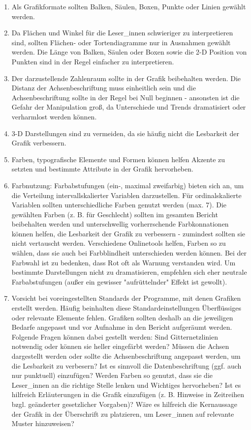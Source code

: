 \documentclass{article}
\begin{document}
\begin{enumerate}
\item Als Grafikformate sollten Balken, Säulen, Boxen, Punkte oder Linien  gewählt werden. 


\item Da Flächen und Winkel für die Leser\_innen schwieriger zu interpretieren sind, sollten Flächen- oder Tortendiagramme nur in Ausnahmen gewählt werden. Die Länge von Balken, Säulen oder Boxen sowie die 2-D Position von Punkten sind in der Regel einfacher zu interpretieren. 


\item Der darzustellende Zahlenraum sollte in der Grafik beibehalten werden. Die Distanz der Achsenbeschriftung muss einheitlich sein und die Achsenbeschriftung sollte in der Regel bei Null beginnen - ansonsten ist die Gefahr der Manipulation groß, da Unterschiede und Trends dramatisiert oder verharmlost werden können.


\item 3-D Darstellungen sind zu vermeiden, da sie häufig nicht die Lesbarkeit der Grafik verbessern. 


\item Farben, typografische Elemente und Formen können helfen Akzente zu setzten und bestimmte Attribute in der Grafik hervorheben.


\item Farbnutzung: Farbabstufungen (ein-, maximal zweifarbig) bieten sich an, um die Verteilung intervallskalierter Variablen darzustellen. Für ordinalskalierte Variablen sollten unterschiedliche Farben genutzt werden (max. 7). Die gewählten Farben (z. B. für Geschlecht) sollten im gesamten Bericht beibehalten werden und unterschwellig vorherrschende Farbkonnationen können helfen, die Lesbarkeit der Grafik zu verbessern - zumindest sollten sie nicht vertauscht werden. Verschiedene Onlinetools helfen, Farben so zu wählen, dass sie auch bei Farbblindheit unterschieden werden können. Bei der Farbwahl ist zu bedenken, dass Rot oft als Warnung verstanden wird. Um bestimmte Darstellungen nicht zu dramatisieren, empfehlen sich eher neutrale Farbabstufungen (außer ein gewisser "aufrüttelnder" Effekt ist gewollt).


\item Vorsicht bei voreingestellten Standards der Programme, mit denen Grafiken erstellt werden. Häufig beinhalten diese Standardeinstellungen Überflüssiges oder relevante Elemente fehlen. Grafiken sollten deshalb an die jeweiligen Bedarfe angepasst und vor Aufnahme in den Bericht aufgeräumt werden. Folgende Fragen können dabei gestellt werden: Sind Gitternetzlinien notwendig oder können sie heller eingefärbt werden? Müssen die Achsen dargestellt werden oder sollte die Achsenbeschriftung angepasst werden, um die Lesbarkeit zu verbesern? Ist es sinnvoll die Datenbeschriftung (ggf. auch nur punktuell) einzufügen? Werden Farben so genutzt, dass sie die Leser\_innen an die richtige Stelle lenken und Wichtiges hervorheben? Ist es hilfreich Erläuterungen in die Grafik einzufügen (z. B. Hinweise in Zeitreihen bzgl. geänderter gesetzlicher Vorgaben)? Wäre es hilfreich die Kernaussage der Grafik in der Überschrift zu platzieren, um Leser\_innen auf relevante Muster hinzuweisen?



\end{enumerate}
\end{document}
